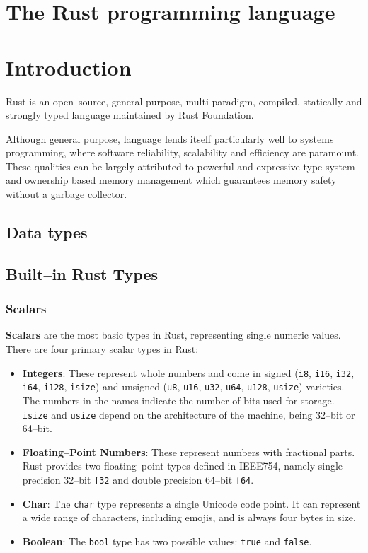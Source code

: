 
\chapter{The Rust programming language}

\chapter*{Introduction}

Rust is an open--source, general purpose, multi paradigm, compiled, statically and strongly typed language maintained by Rust Foundation.

Although general purpose, language lends itself particularly well to systems programming, where software reliability, scalability and efficiency are paramount.
These qualities can be largely attributed to powerful and expressive type system and ownership based memory management which guarantees memory safety without a garbage collector.

\section{Data types}

\section{Built--in Rust Types}

\subsection{Scalars}
\textbf{Scalars} are the most basic types in Rust, representing single numeric values. There are four primary scalar types in Rust:

\begin{itemize}
    \item \textbf{Integers}: These represent whole numbers and come in signed (\texttt{i8}, \texttt{i16}, \texttt{i32}, \texttt{i64}, \texttt{i128}, \texttt{isize}) 
    and unsigned (\texttt{u8}, \texttt{u16}, \texttt{u32}, \texttt{u64}, \texttt{u128}, \texttt{usize}) varieties. 
    The numbers in the names indicate the number of bits used for storage. \texttt{isize} and \texttt{usize} depend on the architecture of the machine, being 32--bit or 64--bit.
    
    \item \textbf{Floating--Point Numbers}: These represent numbers with fractional parts. Rust provides two floating--point types defined in IEEE754, namely single precision 32--bit \texttt{f32} and double precision 64--bit \texttt{f64}.
    
    \item \textbf{Char}: The \texttt{char} type represents a single Unicode code point. It can represent a wide range of characters, including emojis, and is always four bytes in size.
    
    \item \textbf{Boolean}: The \texttt{bool} type has two possible values: \texttt{true} and \texttt{false}.
\end{itemize}

